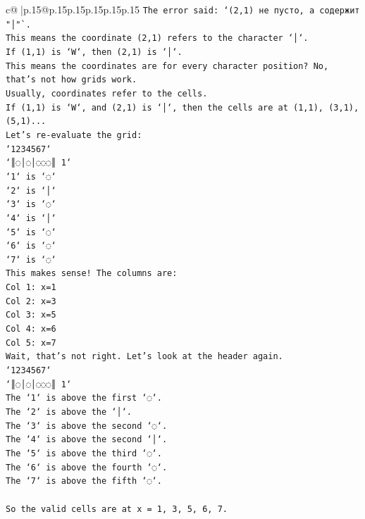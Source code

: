 \documentclass{article}
\begin{document}
{\begin{supertabular}{c@{$\;$}|p{.15\linewidth}@{}p{.15\linewidth}p{.15\linewidth}p{.15\linewidth}p{.15\linewidth}p{.15\linewidth}}
{{{\texttt{The error said: `(2,1) не пусто, а содержит "│"`.} \\
\texttt{This means the coordinate (2,1) refers to the character `│`.} \\
\texttt{If (1,1) is `W`, then (2,1) is `│`.} \\
\texttt{This means the coordinates are for every character position? No, that's not how grids work.} \\
\texttt{Usually, coordinates refer to the cells.} \\
\texttt{If (1,1) is `W`, and (2,1) is `│`, then the cells are at (1,1), (3,1), (5,1)...} \\
\texttt{Let's re{-}evaluate the grid:} \\
\texttt{`1234567`} \\
\texttt{`║◌│◌│◌◌◌║ 1`} \\
\texttt{`1` is `◌`} \\
\texttt{`2` is `│`} \\
\texttt{`3` is `◌`} \\
\texttt{`4` is `│`} \\
\texttt{`5` is `◌`} \\
\texttt{`6` is `◌`} \\
\texttt{`7` is `◌`} \\
\texttt{This makes sense! The columns are:} \\
\texttt{Col 1: x=1} \\
\texttt{Col 2: x=3} \\
\texttt{Col 3: x=5} \\
\texttt{Col 4: x=6} \\
\texttt{Col 5: x=7} \\
\texttt{Wait, that's not right. Let's look at the header again.} \\
\texttt{`1234567`} \\
\texttt{`║◌│◌│◌◌◌║ 1`} \\
\texttt{The `1` is above the first `◌`.} \\
\texttt{The `2` is above the `│`.} \\
\texttt{The `3` is above the second `◌`.} \\
\texttt{The `4` is above the second `│`.} \\
\texttt{The `5` is above the third `◌`.} \\
\texttt{The `6` is above the fourth `◌`.} \\
\texttt{The `7` is above the fifth `◌`.} \\
\\ 
\texttt{So the valid cells are at x = 1, 3, 5, 6, 7.} \\
}}}
\end{supertabular}}
\end{document}
